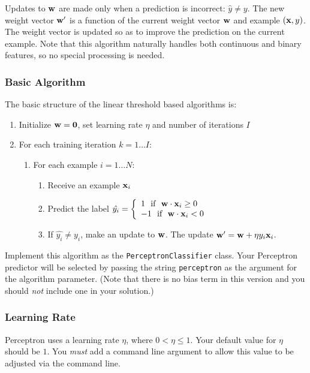 \documentclass[11pt]{article}
\newcommand{\vw}{{\bf w}}
\newcommand{\vx}{{\bf x}}
\newcommand{\vxi}{{\bf x}_i}
\newcommand{\yh}{\hat{y}}
\newcommand{\yi}{y_i}
\newcommand{\code}[1]{{\footnotesize \tt #1}}
\begin{document}
Updates to $\vw$ are made only when a prediction is incorrect: $\yh \ne y$. The new weight vector $\vw'$ is a function of the current weight vector $\vw$ and example $(\vx, y)$. The weight vector is updated so as to improve the prediction on the current example. Note that this algorithm naturally handles both continuous and binary features, so no special processing is needed.

\subsubsection{Basic Algorithm}
\label{sec:algorithm}

The basic structure of the linear threshold based algorithms is:
\begin{enumerate}
\item Initialize $\vw = {\bf 0}$, set learning rate $\eta$ and number of iterations $I$
\item For each training iteration $k = 1 \ldots I$:
	\begin{enumerate}
	\item For each example $i=1\ldots N$:
	\begin{enumerate}
		\item Receive an example $\vxi$
		\item  \label{prediction_rule} Predict the label $\hat{\yi}  =\left\{
		     \begin{array}{lr}
		       1 ~~  \textrm{if} ~~ \vw \cdot \vxi \ge 0  \\
		       -1 ~~  \textrm{if} ~~ \vw \cdot \vxi < 0  
		     \end{array}
		   \right.$
		\item \label{update_step} If  $\hat{\yi} \ne \yi$,
                  make an update to $\vw$. The update $\vw' = \vw + \eta \yi \vxi$.
		\end{enumerate}
	\end{enumerate}
\end{enumerate}

Implement this algorithm as the \code{PerceptronClassifier}
class. Your Perceptron predictor will be selected by passing the
string \code{perceptron} as the argument for the algorithm parameter. (Note that there is no bias term in this version and you should \emph{not} include one in your solution.)

\subsubsection{Learning Rate}
Perceptron uses a learning rate $\eta$, where  $0 < \eta \leq 1$.  Your default value for $\eta$ should be $1$. You \emph{must} add a command line argument to allow this value to be adjusted via the command line. 
\end{document}
